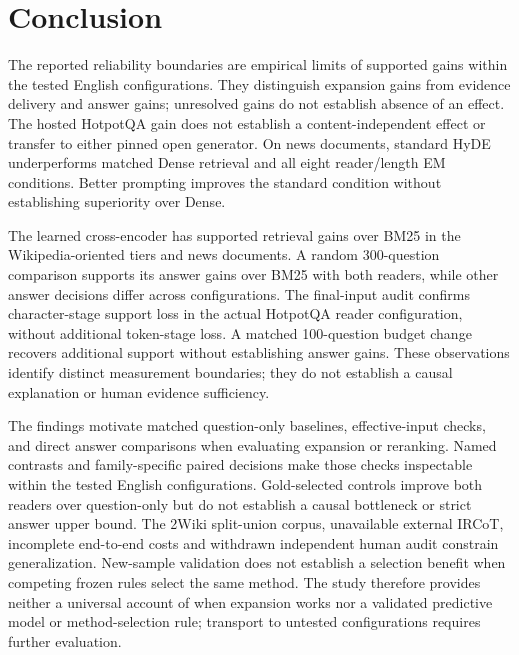 \section{Conclusion}
\label{sec:conclusion}

The reported reliability boundaries are empirical limits of supported gains within the tested English configurations. They distinguish expansion gains from evidence delivery and answer gains; unresolved gains do not establish absence of an effect. The hosted HotpotQA gain does not establish a content-independent effect or transfer to either pinned open generator. On news documents, standard HyDE underperforms matched Dense retrieval and all eight reader/length EM conditions. Better prompting improves the standard condition without establishing superiority over Dense.

The learned cross-encoder has supported retrieval gains over BM25 in the Wikipedia-oriented tiers and news documents. A random 300-question comparison supports its answer gains over BM25 with both readers, while other answer decisions differ across configurations. The final-input audit confirms character-stage support loss in the actual HotpotQA reader configuration, without additional token-stage loss. A matched 100-question budget change recovers additional support without establishing answer gains. These observations identify distinct measurement boundaries; they do not establish a causal explanation or human evidence sufficiency.

The findings motivate matched question-only baselines, effective-input checks, and direct answer comparisons when evaluating expansion or reranking. Named contrasts and family-specific paired decisions make those checks inspectable within the tested English configurations. Gold-selected controls improve both readers over question-only but do not establish a causal bottleneck or strict answer upper bound. The 2Wiki split-union corpus, unavailable external IRCoT, incomplete end-to-end costs and withdrawn independent human audit constrain generalization. New-sample validation does not establish a selection benefit when competing frozen rules select the same method. The study therefore provides neither a universal account of when expansion works nor a validated predictive model or method-selection rule; transport to untested configurations requires further evaluation.
